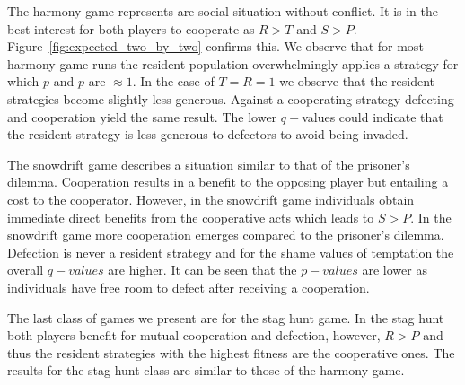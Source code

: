 \documentclass[11pt]{article}
\theoremstyle{plainCl1}
\theoremstyle{plainCl2}
\begin{document}
The harmony game represents are social situation without conflict. It is in the
best interest for both players to cooperate as \(R > T\) and \(S > P\).
Figure~\ref{fig:expected_two_by_two} confirms this. We observe that for most
harmony game runs the resident population overwhelmingly applies a strategy for
which \(p\) and \(p\) are \(\approx 1\). In the case of \(T = R = 1\) we observe
that the resident strategies become slightly less generous. Against a cooperating
strategy defecting and cooperation yield the same result. The lower \(q-\)values
could indicate that the resident strategy is less generous to defectors to avoid
being invaded.

The snowdrift game describes a situation similar to that of the prisoner's
dilemma. Cooperation results in a benefit to the opposing player but entailing a
cost to the cooperator. However, in the snowdrift game individuals obtain
immediate direct benefits from the cooperative acts which leads to \(S > P\). In
the snowdrift game more cooperation emerges compared to the prisoner's dilemma.
Defection is never a resident strategy and for the shame values of temptation
the overall \(q-values\) are higher. It can be seen that the \(p-values\) are
lower as individuals have free room to defect after receiving a cooperation.

The last class of games we present are for the stag hunt game. In the stag hunt
both players benefit for mutual cooperation and defection, however, \(R > P\)
and thus the resident strategies with the highest fitness are the cooperative
ones. The results for the stag hunt class are similar to those of the harmony
game.
\end{document}
